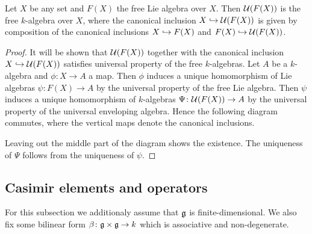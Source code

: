 \begin{lem}
 Let $X$ be any set and $F(X)$ the free Lie algebra over $X$. Then $\mathcal{U}(F(X))$ is the free $k$-algebra over $X$, where the canonical inclusion $X \hookrightarrow \mathcal{U}(F(X))$ is given by composition of the canonical inclusions $X \hookrightarrow F(X)$ and $F(X) \hookrightarrow \mathcal{U}(F(X))$.
\end{lem}
\begin{proof}
 It will be shown that $\mathcal{U}(F(X))$ together with the canonical inclusion $X \hookrightarrow \mathcal{U}(F(X))$ satisfies universal property of the free $k$-algebras. Let $A$ be a $k$-algebra and $\phi \colon X \to A$ a map. Then $\phi$ induces a unique homomorphism of Lie algebras $\psi \colon F(X) \to A$ by the universal property of the free Lie algebra. Then $\psi$ induces a unique homomorphism of $k$-algebras $\Psi \colon \mathcal{U}(F(X)) \to A$ by the universal property of the universal enveloping algebra. Hence the following diagram commutes, where the vertical maps denote the canonical inclusions.
 \begin{center}
 \end{center}
 Leaving out the middle part of the diagram shows the existence. The uniqueness of $\Psi$ follows from the uniqueness of $\psi$.
\end{proof}










\subsection{Casimir elements and operators}
For this subsection we additionaly assume that $\mathfrak{g}$ is finite-dimensional. We also fix some bilinear form $\beta \colon \mathfrak{g} \times \mathfrak{g} \to k$ which is associative and non-degenerate.



